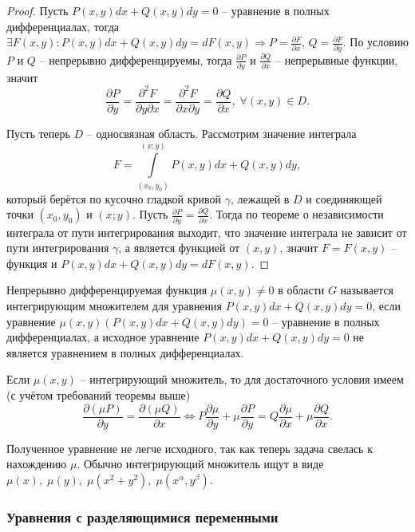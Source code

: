 \begin{proof}
    Пусть $P(x, y)dx + Q(x, y)dy = 0$ -- уравнение в полных дифференциалах, тогда $\exists F(x, y): P(x, y)dx + Q(x, y)dy = dF(x, y) \Rightarrow P = \frac{\partial F}{\partial x}$, $Q = \frac{\partial F}{\partial y}$. По условию $P$ и $Q$ -- непрерывно дифференцируемы, тогда $\frac{\partial P}{\partial y}$ и $\frac{\partial Q}{\partial x}$ -- непрерывные функции, значит 
    \begin{equation}
        \frac{\partial P}{\partial y} = \frac{\partial^2 F}{\partial y \partial x} = \frac{\partial^2 F}{\partial x \partial y} = \frac{\partial Q}{\partial x}, \; \forall (x, y) \in D.
    \end{equation}

    Пусть теперь $D$ -- односвязная область. Рассмотрим значение интеграла
    \[ F = \int\limits^{(x; y)}_{(x_0, y_0)} P(x, y) dx + Q(x, y) dy, \]
    который берётся по кусочно гладкой кривой $\gamma$, лежащей в $D$ и соединяющей точки $(x_0, y_0)$ и $(x; y)$. Пусть $\frac{\partial P}{\partial y} = \frac{\partial Q}{\partial x}$. Тогда по теореме о независимости интеграла от пути интегрирования выходит, что значение интеграла не зависит от пути интегрирования $\gamma$, а является функцией от $(x, y)$, значит $F = F(x, y)$ -- функция и $P(x, y)dx + Q(x, y)dy = dF(x, y)$.
\end{proof}

\begin{definition}
    Непрерывно дифференцируемая функция $\mu(x, y) \neq 0$ в области $G$ называется интегрирующим множителем для уравнения $P(x, y) dx + Q(x, y) dy = 0$, если уравнение $\mu(x, y) (P(x, y) dx + Q(x, y) dy) = 0$ -- уравнение в полных дифференциалах, а исходное уравнение $P(x, y) dx + Q(x, y) dy = 0$ не является уравнением в полных дифференциалах.
\end{definition}

Если $\mu(x, y)$ -- интегрирующий множитель, то для достаточного условия имеем (с учётом требований теоремы выше)
\[ \frac{\partial (\mu P)}{\partial y} = \frac{\partial (\mu Q)}{\partial x} \Leftrightarrow P \frac{\partial \mu}{\partial y} + \mu \frac{\partial P}{\partial y} = Q \frac{\partial \mu}{\partial x} + \mu \frac{\partial Q}{\partial x}. \]

Полученное уравнение не легче исходного, так как теперь задача свелась к нахождению $\mu$. Обычно интегрирующий множитель ищут в виде $\mu(x), \; \mu(y), \; \mu(x^2 + y^2), \; \mu (x^{\alpha}, y^ {\beta})$.

\subsubsection{Уравнения с разделяющимися переменными}

